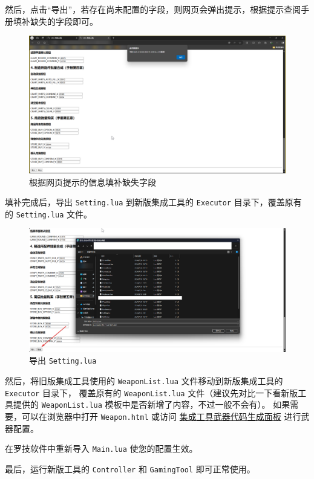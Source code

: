 然后，点击“导出”，若存在尚未配置的字段，则网页会弹出提示，根据提示查阅手册填补缺失的字段即可。

\begin{figure}[H]
    \Centering
    \includegraphics[width=\textwidth]{docs/assets/update/export_error}
    \caption{根据网页提示的信息填补缺失字段}
\end{figure}

填补完成后，导出 \lstinline{Setting.lua} 到新版集成工具的 \lstinline{Executor} 目录下，覆盖原有的 \lstinline{Setting.lua} 文件。

\begin{figure}[H]
    \Centering
    \includegraphics[width=\textwidth]{docs/assets/update/override_setting}
    \caption{导出 \lstinline{Setting.lua}}
\end{figure}

然后，将旧版集成工具使用的 \lstinline{WeaponList.lua} 文件移动到新版集成工具的 \lstinline{Executor} 目录下，
覆盖原有的 \lstinline{WeaponList.lua} 文件（建议先对比一下看新版工具提供的 \lstinline{WeaponList.lua} 模板中是否新增了内容，不过一般不会有）。
如果需要，可以在浏览器中打开 \lstinline{Weapon.html} 或访问 \href{https://macrohard.fun/CSOL-Utilities/Weapon.html}{集成工具武器代码生成面板} 进行武器配置。

在罗技软件中重新导入 \lstinline{Main.lua} 使您的配置生效。

最后，运行新版工具的 \lstinline{Controller} 和 \lstinline{GamingTool} 即可正常使用。